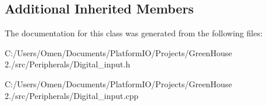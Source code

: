 \subsection*{Additional Inherited Members}


The documentation for this class was generated from the following files\+:\begin{DoxyCompactItemize}
\item 
C\+:/\+Users/\+Omen/\+Documents/\+Platform\+I\+O/\+Projects/\+Green\+House 2./src/\+Peripherals/Digital\+\_\+input.\+h\item 
C\+:/\+Users/\+Omen/\+Documents/\+Platform\+I\+O/\+Projects/\+Green\+House 2./src/\+Peripherals/Digital\+\_\+input.\+cpp\end{DoxyCompactItemize}
